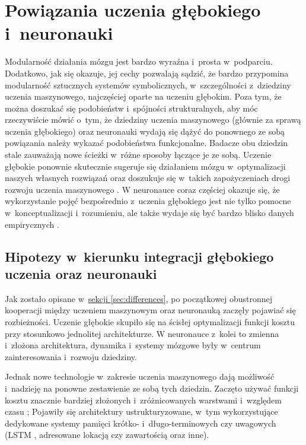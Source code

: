\chapter{Powiązania uczenia głębokiego i~neuronauki}

Modularność działania mózgu jest bardzo wyraźna i~prosta w~podparciu.
Dodatkowo, jak się okazuje, jej cechy pozwalają sądzić, że bardzo przypomina modularność sztucznych systemów symbolicznych, w~szczególności z~dziedziny uczenia maszynowego, najczęściej oparte na uczeniu głębokim.
Poza tym, że można doszukać się podobieństw i~spójności strukturalnych, aby móc rzeczywiście mówić o~tym, że dziedziny uczenia maszynowego (głównie za sprawą uczenia głębokiego) oraz neuronauki wydają się dążyć do ponownego ze sobą powiązania należy wykazać podobieństwa funkcjonalne.
Badacze obu dziedzin stale zauważają nowe ścieżki w~różne sposoby łączące je ze sobą.
Uczenie głębokie ponownie skutecznie sugeruje się działaniem mózgu w~optymalizacji naszych własnych rozwiązań oraz doszukuje się w~takich zapożyczeniach drogi rozwoju uczenia maszynowego \cite{lake2017building}.
W neuronauce coraz częściej okazuje się, że wykorzystanie pojęć bezpośrednio z~uczenia głębokiego jest nie tylko pomocne w~konceptualizacji i~rozumieniu, ale także wydaje się być bardzo blisko danych empirycznych \cite{dayan2001theoretical, doya1999computations}.

\section{Hipotezy w~kierunku integracji głębokiego uczenia oraz neuronauki}

Jak zostało opisane w~\hyperref[sec:differences]{sekcji \ref*{sec:differences}}, po początkowej obustronnej kooperacji między uczeniem maszynowym oraz neuronauką zaczęły pojawiać się rozbieżności.
Uczenie głębokie skupiło się na ścisłej optymalizacji funkcji kosztu przy stosunkowo jednolitej architekturze.
W neuronauce z~kolei to zmienna i~złożona architektura, dynamika i~systemy mózgowe były w~centrum zainteresowania i~rozwoju dziedziny.

Jednak nowe technologie w~zakresie uczenia maszynowego dają możliwość i~nadzieję na ponowne zestawienie ze sobą tych dziedzin.
Zaczęto używać funkcji kosztu znacznie bardziej złożonych i~zróżnicowanych warstwami i~względem czasu \cite{gulccehre2016knowledge, saxe2013exact};
Pojawiły się architektury ustrukturyzowane, w~tym wykorzystujące dedykowane systemy pamięci krótko- i~długo-terminowych czy uwagowych (LSTM \cite{chung2014empirical}, adresowane lokacją czy zawartością \cite{graves2014neural} oraz inne).

